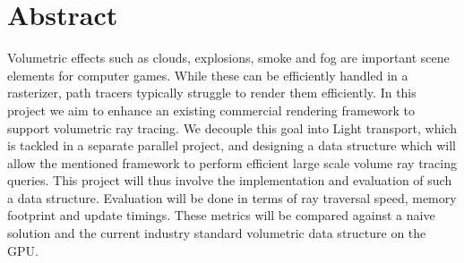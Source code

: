 \section*{Abstract} \label{abstract}
Volumetric effects such as clouds, explosions, smoke and fog are important scene elements for computer games. While these can be efficiently handled in a rasterizer, path tracers typically struggle to render them efficiently. In this project we aim to enhance an existing commercial rendering framework to support volumetric ray tracing. We decouple this goal into Light transport, which is tackled in a separate parallel project, and designing a data structure which will allow the mentioned framework to perform efficient large scale volume ray tracing queries. This project will thus involve the implementation and evaluation of such a data structure. Evaluation will be done in terms of ray traversal speed, memory footprint and update timings. These metrics will be compared against a naive solution and the current industry standard volumetric data structure on the GPU.